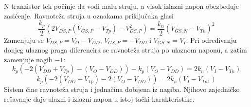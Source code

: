 N tranzistor tek počinje da vodi malu struju, a visok izlazni napon obezbeđuje zasićenje. Ravnoteža struja u oznakama priključaka glasi
\[\frac{k_p}2\left(2V_{DS,P}(V_{GS,P}-V_{Tp})-V_{DS,P}^2\right)=\frac{k_n}2(V_{GS,N}-V_{Tn})^2\]
Zamenjuju se $V_{DS,P}=V_O-V_{DD}$, $V_{GS,P}=-V_{DD}$ i $V_{GS,N}=V_I$. Pri određivanju donjeg ulaznog praga diferencira se ravnoteža struja po ulaznom naponu, a zatim zamenjuje nagib $-1$:
\[k_p\left(-2(V_{DD}+V_{Tp})-(V_O-V_{DD})\right)-k_p(V_O-V_{DD})=2k_n(V_I-V_{Tn})\]
\[k_p\left(-2(V_{DD}+V_{Tp})-2(V_O-V_{DD})\right)=2k_n(V_I-V_{Tn1})\]
Sistem čine ravnoteža struja i jednačina dobijena iz nagiba. Njihovo zajedničko rešavanje daje ulazni i izlazni napon u istoj tački karakteristike.
